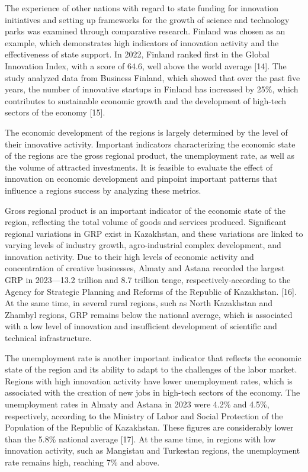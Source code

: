 \begin{multicols}{2}
The experience of other nations with regard to state funding for
innovation initiatives and setting up frameworks for the growth of
science and technology parks was examined through comparative research.
Finland was chosen as an example, which demonstrates high indicators of
innovation activity and the effectiveness of state support. In 2022,
Finland ranked first in the Global Innovation Index, with a score of
64.6, well above the world average {[}14{]}. The study analyzed data
from Business Finland, which showed that over the past five years, the
number of innovative startups in Finland has increased by 25\%, which
contributes to sustainable economic growth and the development of
high-tech sectors of the economy {[}15{]}.

The economic development of the regions is largely determined by the
level of their innovative activity. Important indicators characterizing
the economic state of the regions are the gross regional product, the
unemployment rate, as well as the volume of attracted investments. It is
feasible to evaluate the effect of innovation on economic development
and pinpoint important patterns that influence a
region\textquotesingle s success by analyzing these metrics.

Gross regional product is an important indicator of the economic state
of the region, reflecting the total volume of goods and services
produced. Significant regional variations in GRP exist in Kazakhstan,
and these variations are linked to varying levels of industry growth,
agro-industrial complex development, and innovation activity. Due to
their high levels of economic activity and concentration of creative
businesses, Almaty and Astana recorded the largest GRP in 2023---13.2
trillion and 8.7 trillion tenge, respectively-according to the Agency
for Strategic Planning and Reforms of the Republic of Kazakhstan.
{[}16{]}. At the same time, in several rural regions, such as North
Kazakhstan and Zhambyl regions, GRP remains below the national average,
which is associated with a low level of innovation and insufficient
development of scientific and technical infrastructure.

The unemployment rate is another important indicator that reflects the
economic state of the region and its ability to adapt to the challenges
of the labor market. Regions with high innovation activity have lower
unemployment rates, which is associated with the creation of new jobs in
high-tech sectors of the economy. The unemployment rates in Almaty and
Astana in 2023 were 4.2\% and 4.5\%, respectively, according to the
Ministry of Labor and Social Protection of the Population of the
Republic of Kazakhstan. These figures are considerably lower than the
5.8\% national average {[}17{]}. At the same time, in regions with low
innovation activity, such as Mangistau and Turkestan regions, the
unemployment rate remains high, reaching 7\% and above.


\end{multicols}
